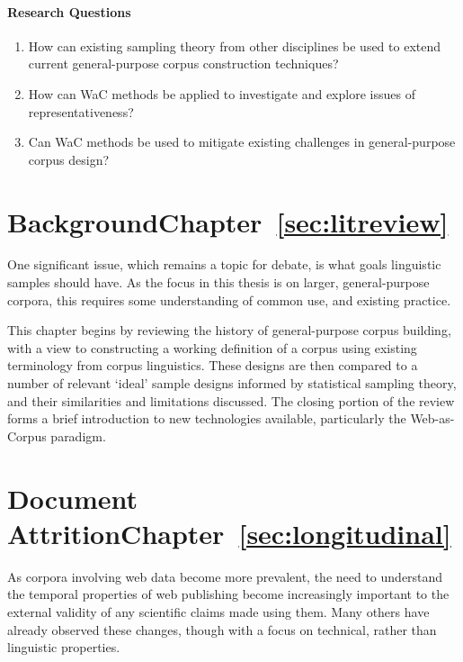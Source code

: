 \paragraph{Research Questions}
\begin{enumerate}[label=\textbf{RQ\arabic*}]
    \item \label{rq1} How can existing sampling theory from other disciplines be used to extend current general-purpose corpus construction techniques?
    \item \label{rq2} How can WaC methods be applied to investigate and explore issues of representativeness?
    \item \label{rq3} Can WaC methods be used to mitigate existing challenges in general-purpose corpus design?

\end{enumerate}



\section*{Background\hfill{}Chapter~\ref{sec:litreview}}
One significant issue, which remains a topic for debate, is what goals linguistic samples should have.  As the focus in this thesis is on larger, general-purpose corpora, this requires some understanding of common use, and existing practice.

This chapter begins by reviewing the history of general-purpose corpus building, with a view to constructing a working definition of a corpus using existing terminology from corpus linguistics.  These designs are then compared to a number of relevant `ideal' sample designs informed by statistical sampling theory, and their similarities and limitations discussed.  The closing portion of the review forms a brief introduction to new technologies available, particularly the Web-as-Corpus paradigm.


\section*{Document Attrition\hfill{}Chapter~\ref{sec:longitudinal}}
As corpora involving web data become more prevalent, the need to understand the temporal properties of web publishing become increasingly important to the external validity of any scientific claims made using them.  Many others have already observed these changes, though with a focus on technical, rather than linguistic properties.

